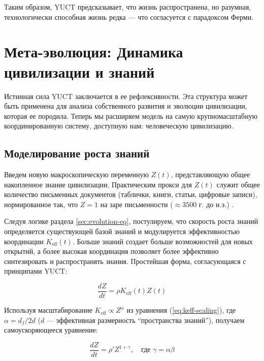 \documentclass[12pt,a4paper]{article}
\theoremstyle{remark}
\newcommand{\df}{d_{\!f}}
\begin{document}
	Таким образом, YUCT предсказывает, что жизнь распространена, но разумная, технологически способная жизнь редка — что согласуется с парадоксом Ферми.
	
	\section{Мета-эволюция: Динамика цивилизации и знаний}
	\label{sec:meta-evolution}
	
	Истинная сила YUCT заключается в ее рефлексивности. Эта структура может быть применена для анализа собственного развития и эволюции цивилизации, которая ее породила. Теперь мы расширяем модель на самую крупномасштабную координированную систему, доступную нам: человеческую цивилизацию.
	
	\subsection{Моделирование роста знаний}
	
	Введем новую макроскопическую переменную $Z(t)$, представляющую общее накопленное знание цивилизации. Практическим прокси для $Z(t)$ служит общее количество письменных документов (таблички, книги, статьи, цифровые записи), нормированное так, что $Z=1$ на заре письменности ($\approx 3500$ г. до н.э.) \cite{Buringh2009, Desai2026}.
	
	Следуя логике раздела \ref{sec:evolution-eq}, постулируем, что скорость роста знаний определяется существующей базой знаний и модулируется эффективностью координации $K_{\text{eff}}(t)$. Больше знаний создает больше возможностей для новых открытий, а более высокая координация позволяет более эффективно синтезировать и распространять знания. Простейшая форма, согласующаяся с принципами YUCT:
	
	\begin{equation}
		\frac{dZ}{dt} = \rho K_{\text{eff}}(t) Z(t)
		\label{eq:Z-growth}
	\end{equation}
	
	Используя масштабирование $K_{\text{eff}} \propto Z^{\alpha}$ из уравнения (\ref{eq:keff-scaling}), где $\alpha = \df/2d$ ($d$ — эффективная размерность ``пространства знаний''), получаем самоускоряющееся уравнение:
	
	\begin{equation}
		\frac{dZ}{dt} = \rho' Z^{1+\gamma}, \quad \text{где } \gamma = \alpha \beta
		\label{eq:Z-self-accel}
	\end{equation}
	
\end{document}
